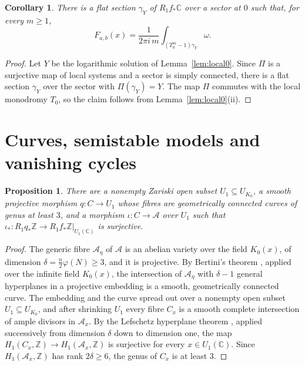 \documentclass[11pt]{amsart}
\newtheorem{proposition}[theorem]{Proposition}
\newtheorem{corollary}[theorem]{Corollary}
\theoremstyle{definition}
\theoremstyle{remark}
\numberwithin{equation}{section}
\newcommand{\Z}{\mathbb{Z}}
\newcommand{\C}{\mathbb{C}}
\newcommand{\cA}{\mathcal{A}}
\newcommand{\Fab}{F_{a,b}}
\begin{document}
\begin{corollary}\label{cor:periodH}
There is a flat section $\gamma_Y$ of $R_1f_*\C$ over a sector at $0$ such that, for every $m\ge1$,
\[
\Fab(x)=\frac1{2\pi i\,m}\int_{(T_0^m-1)\gamma_Y}\omega .
\]
\end{corollary}

\begin{proof}
Let $Y$ be the logarithmic solution of Lemma~\ref{lem:local0}. Since $\Pi$ is a surjective map of local systems and a sector is simply connected, there is a flat section $\gamma_Y$ over the sector with $\Pi(\gamma_Y)=Y$. The map $\Pi$ commutes with the local monodromy $T_0$, so the claim follows from Lemma~\ref{lem:local0}(ii).
\end{proof}

\section{Curves, semistable models and vanishing cycles}\label{sec:curves}

\begin{proposition}\label{prop:curves}
There are a nonempty Zariski open subset $U_1\subseteq U_{K_0}$, a smooth projective morphism $q:C\to U_1$ whose fibres are geometrically connected curves of genus at least $3$, and a morphism $\iota:C\to\cA$ over $U_1$ such that $\iota_*:R_1q_*\Z\to R_1f_*\Z|_{U_1(\C)}$ is surjective.
\end{proposition}

\begin{proof}
The generic fibre $\cA_\eta$ of $\cA$ is an abelian variety over the field $K_0(x)$, of dimension $\delta=\frac n2\varphi(N)\ge3$, and it is projective. By Bertini's theorem \citep[Tag 0FD6 and Section 37.32]{StacksProject}, applied over the infinite field $K_0(x)$, the intersection of $\cA_\eta$ with $\delta-1$ general hyperplanes in a projective embedding is a smooth, geometrically connected curve. The embedding and the curve spread out over a nonempty open subset $U_1\subseteq U_{K_0}$, and after shrinking $U_1$ every fibre $C_x$ is a smooth complete intersection of ample divisors in $\cA_x$. By the Lefschetz hyperplane theorem \citep[Theorem~3]{Catanese2015}, applied successively from dimension $\delta$ down to dimension one, the map $H_1(C_x,\Z)\to H_1(\cA_x,\Z)$ is surjective for every $x\in U_1(\C)$. Since $H_1(\cA_x,\Z)$ has rank $2\delta\ge6$, the genus of $C_x$ is at least $3$.
\end{proof}
\end{document}
